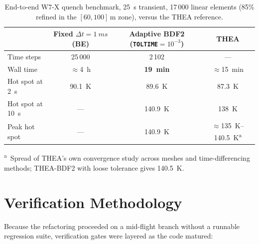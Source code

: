 \documentclass[11pt,a4paper]{article}
\newcommand{\code}[1]{\texttt{#1}}
\begin{document}
\begin{table}[ht]
  \centering
  \caption{End-to-end W7-X quench benchmark, \SI{25}{s} transient, 17\,000 linear
           elements (85\% refined in the $[60,100]$\,\si{m} zone), versus the
           THEA reference.}
  \label{tab:endtoend}
  \begin{tabular}{lccc}
    \toprule
     & Fixed $\Delta t = \SI{1}{ms}$ (BE) & Adaptive BDF2 (\code{TOLTIME}$=10^{-3}$) & THEA \\
    \midrule
    Time steps          & 25\,000            & 2\,102   & --- \\
    Wall time           & $\approx$\SI{4}{h} & \textbf{\SI{19}{min}} & $\approx$\SI{15}{min} \\
    Hot spot at \SI{2}{s}  & \SI{90.1}{K}    & \SI{89.6}{K}  & \SI{87.3}{K} \\
    Hot spot at \SI{10}{s} & ---              & \SI{140.9}{K} & \SI{138}{K} \\
    Peak hot spot          & ---              & \SI{140.9}{K} & $\approx$\SIrange{135}{140.5}{K}\textsuperscript{a} \\
    \bottomrule
  \end{tabular}

  \vspace{2pt}
  {\footnotesize \textsuperscript{a}~Spread of THEA's own convergence study across
  meshes and time-differencing methods; THEA-BDF2 with loose tolerance gives
  \SI{140.5}{K}.}
\end{table}

\section{Verification Methodology}

Because the refactoring proceeded on a mid-flight branch without a runnable regression
suite, verification gates were layered as the code matured:
\end{document}
